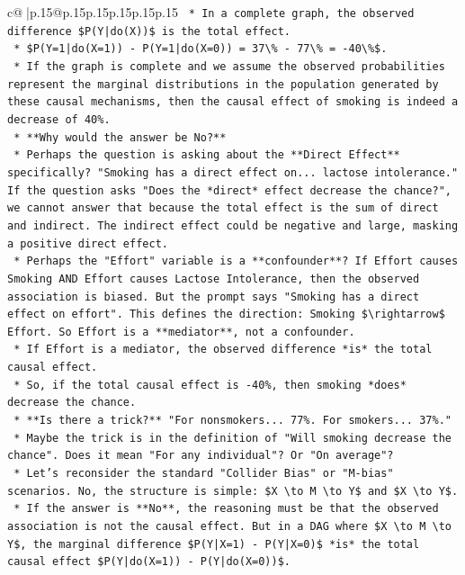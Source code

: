 \documentclass{article}
\begin{document}
{\begin{supertabular}{c@{$\;$}|p{.15\linewidth}@{}p{.15\linewidth}p{.15\linewidth}p{.15\linewidth}p{.15\linewidth}p{.15\linewidth}}
{{{\texttt{    *   In a complete graph, the observed difference \$P(Y|do(X))\$ is the total effect.} \\
\texttt{    *   \$P(Y=1|do(X=1)) {-} P(Y=1|do(X=0)) = 37\textbackslash{}\% {-} 77\textbackslash{}\% = {-}40\textbackslash{}\%\$.} \\
\texttt{    *   If the graph is complete and we assume the observed probabilities represent the marginal distributions in the population generated by these causal mechanisms, then the causal effect of smoking is indeed a decrease of 40\%.} \\
\texttt{    *   **Why would the answer be No?**} \\
\texttt{        *   Perhaps the question is asking about the **Direct Effect** specifically? "Smoking has a direct effect on... lactose intolerance." If the question asks "Does the *direct* effect decrease the chance?", we cannot answer that because the total effect is the sum of direct and indirect. The indirect effect could be negative and large, masking a positive direct effect.} \\
\texttt{        *   Perhaps the "Effort" variable is a **confounder**? If Effort causes Smoking AND Effort causes Lactose Intolerance, then the observed association is biased. But the prompt says "Smoking has a direct effect on effort". This defines the direction: Smoking \$\textbackslash{}rightarrow\$ Effort. So Effort is a **mediator**, not a confounder.} \\
\texttt{        *   If Effort is a mediator, the observed difference *is* the total causal effect.} \\
\texttt{        *   So, if the total causal effect is {-}40\%, then smoking *does* decrease the chance.} \\
\texttt{        *   **Is there a trick?** "For nonsmokers... 77\%. For smokers... 37\%."} \\
\texttt{        *   Maybe the trick is in the definition of "Will smoking decrease the chance". Does it mean "For any individual"? Or "On average"?} \\
\texttt{        *   Let's reconsider the standard "Collider Bias" or "M{-}bias" scenarios. No, the structure is simple: \$X \textbackslash{}to M \textbackslash{}to Y\$ and \$X \textbackslash{}to Y\$.} \\
\texttt{        *   If the answer is **No**, the reasoning must be that the observed association is not the causal effect. But in a DAG where \$X \textbackslash{}to M \textbackslash{}to Y\$, the marginal difference \$P(Y|X=1) {-} P(Y|X=0)\$ *is* the total causal effect \$P(Y|do(X=1)) {-} P(Y|do(X=0))\$.} \\
}}}
\end{supertabular}}
\end{document}
